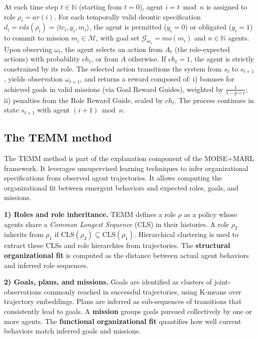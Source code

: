 \documentclass[pdflatex,sn-mathphys-num]{sn-jnl}%
\theoremstyle{thmstyleone}%
\theoremstyle{thmstyletwo}%
\theoremstyle{thmstylethree}%
\begin{document}
\noindent At each time step $t \in \mathbb{N}$ (starting from $t=0$), agent $i = t \bmod n$ is assigned to role $\rho_i = ar(i)$. For each temporally valid deontic specification $d_i = rds(\rho_i) = \langle tc_i, y_i, m_i \rangle$, the agent is permitted ($y_i = 0$) or obligated ($y_i = 1$) to commit to mission $m_i \in \mathcal{M}$, with goal set $\mathcal{G}_{m_i} = mo(m_i)$ and $n \in \mathbb{N}$ agents.
%
Upon observing $\omega_t$, the agent selects an action from $A_t$ (the role-expected actions) with probability $ch_t$, or from $A$ otherwise. If $ch_t = 1$, the agent is strictly constrained by its role.
%
The selected action transitions the system from $s_t$ to $s_{t+1}$, yields observation $\omega_{t+1}$, and returns a reward composed of:
i) bonuses for achieved goals in valid missions (via Goal Reward Guides), weighted by $\frac{1}{1 - p + \epsilon}$;
ii) penalties from the Role Reward Guide, scaled by $ch_t$.
%
The process continues in state $s_{t+1}$ with agent $(i + 1) \bmod n$.

\subsection{The TEMM method}
\label{sec:TEMM_algorithm}

The TEMM method is part of the explanation component of the MOISE+MARL framework. It leverages unsupervised learning techniques to infer organizational specifications from observed agent trajectories. It allows computing the organizational fit between emergent behaviors and expected roles, goals, and missions.

\textbf{1) Roles and role inheritance.} \quad TEMM defines a role $\rho$ as a policy whose agents share a \textit{Common Longest Sequence} (CLS) in their histories. A role $\rho_2$ inherits from $\rho_1$ if $\text{CLS}(\rho_2) \subseteq \text{CLS}(\rho_1)$. Hierarchical clustering is used to extract these CLSs and role hierarchies from trajectories. The \textbf{structural organizational fit} is computed as the distance between actual agent behaviors and inferred role sequences.

\textbf{2) Goals, plans, and missions.} \quad Goals are identified as clusters of joint-observations commonly reached in successful trajectories, using K-means over trajectory embeddings. Plans are inferred as sub-sequences of transitions that consistently lead to goals. A \textbf{mission} groups goals pursued collectively by one or more agents. The \textbf{functional organizational fit} quantifies how well current behaviors match inferred goals and missions.
\end{document}

